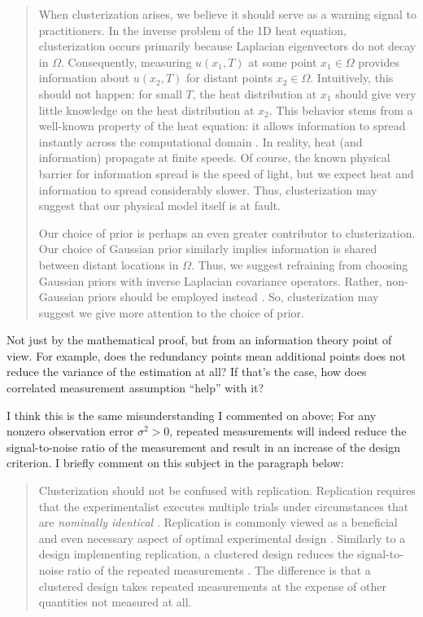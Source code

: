 \begin{quote}
  When clusterization arises, we believe it should serve as a warning
  signal to practitioners. In the inverse problem of the 1D heat
  equation, clusterization occurs primarily because Laplacian
  eigenvectors do not decay in $\Omega$. Consequently, measuring
  $u(x_1, T)$ at some point $x_1 \in \Omega$ provides information
  about $u(x_2,T)$ for distant points $x_2 \in \Omega$. Intuitively,
  this should not happen: for small $T$, the heat distribution at
  $x_1$ should give very little knowledge on the heat distribution at
  $x_2$. This behavior stems from a well-known property of the heat
  equation: it allows information to spread instantly across the
  computational domain \cite{renardy2006PDE}. In reality, heat (and
  information) propagate at finite speeds. Of course, the known
  physical barrier for information spread is the speed of light, but
  we expect heat and information to spread considerably slower. Thus,
  clusterization may suggest that our physical model itself is at
  fault.
  
  Our choice of prior is perhaps an even greater contributor to
  clusterization. Our choice of Gaussian prior similarly implies
  information is shared between distant locations in $\Omega$. Thus,
  we suggest refraining from choosing Gaussian priors with inverse
  Laplacian covariance operators. Rather, non-Gaussian priors should
  be employed instead \cite{hosseini2017, hosseini2019}. So,
  clusterization may suggest we give more attention to the choice of
  prior.
\end{quote}


\RC Not just by the mathematical proof, but from an information theory
point of view. For example, does the redundancy points mean additional
points does not reduce the variance of the estimation at all? If
that’s the case, how does correlated measurement assumption “help”
with it?

\AR I think this is the same misunderstanding I commented on above;
For any nonzero observation error $\sigma^2 > 0$, repeated
measurements will indeed reduce the signal-to-noise ratio of the
measurement and result in an increase of the design criterion. I
briefly comment on this subject in the paragraph below:

\begin{quote}
  Clusterization should not be confused with replication. Replication
  requires that the experimentalist executes multiple trials under
  circumstances that are \emph{nominally identical} \cite[Section
    1.2.4]{morris2011}. Replication is commonly viewed as a beneficial
  and even necessary aspect of optimal experimental design
  \cite{fisher1949design, morris2011,
    schafer2001replication}. Similarly to a design implementing
  replication, a clustered design reduces the signal-to-noise ratio of
  the repeated measurements \cite{telford2007brief}. The difference is
  that a clustered design takes repeated measurements at the expense
  of other quantities not measured at all.
\end{quote}


